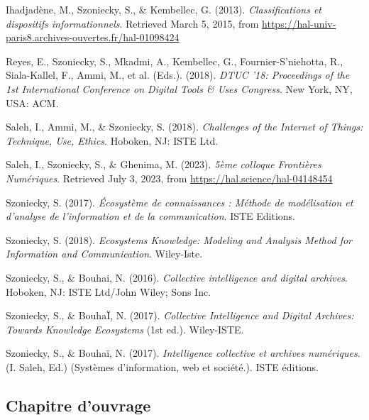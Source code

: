 \documentclass[
  a4paper,
  DIV=11,
  numbers=noendperiod]{scrreprt}
\newlength{\cslhangindent}
\newenvironment{CSLReferences}[2] %
 {\begin{list}{}{%
  \setlength{\itemindent}{0pt}
  \setlength{\leftmargin}{0pt}
  \setlength{\parsep}{0pt}
  \ifodd #1
   \setlength{\leftmargin}{\cslhangindent}
   \setlength{\itemindent}{-1\cslhangindent}
  \fi
  \setlength{\itemsep}{#2\baselineskip}}}
 {\end{list}}
\begin{document}
\label{refs-livre}
\begin{CSLReferences}{1}{0}
Ihadjadène, M., Szoniecky, S., \& Kembellec, G. (2013).
\emph{Classifications et dispositifs informationnels}. Retrieved March
5, 2015, from
\url{https://hal-univ-paris8.archives-ouvertes.fr/hal-01098424}

Reyes, E., Szoniecky, S., Mkadmi, A., Kembellec, G.,
Fournier-S'niehotta, R., Siala-Kallel, F., Ammi, M., et al. (Eds.).
(2018). \emph{{DTUC} '18: {Proceedings} of the 1st {International}
{Conference} on {Digital} {Tools} \& {Uses} {Congress}}. New York, NY,
USA: ACM.

Saleh, I., Ammi, M., \& Szoniecky, S. (2018). \emph{Challenges of the
{Internet} of {Things}: {Technique}, {Use}, {Ethics}}. Hoboken, NJ: ISTE
Ltd.

Saleh, I., Szoniecky, S., \& Ghenima, M. (2023). \emph{5ème colloque
{Frontières} {Numériques}}. Retrieved July 3, 2023, from
\url{https://hal.science/hal-04148454}

Szoniecky, S. (2017). \emph{Écosystème de connaissances : Méthode de
modélisation et d'analyse de l'information et de la communication}. ISTE
Editions.

Szoniecky, S. (2018). \emph{Ecosystems {Knowledge}: {Modeling} and
{Analysis} {Method} for {Information} and {Communication}}. Wiley-Iste.

Szoniecky, S., \& Bouhai, N. (2016). \emph{Collective intelligence and
digital archives}. Hoboken, NJ: ISTE Ltd/John Wiley; Sons Inc.

Szoniecky, S., \& BouhaÏ, N. (2017). \emph{Collective {Intelligence} and
{Digital} {Archives}: {Towards} {Knowledge} {Ecosystems}} (1st ed.).
Wiley-ISTE.

Szoniecky, S., \& Bouhaï, N. (2017). \emph{Intelligence collective et
archives numériques}. (I. Saleh, Ed.) (Systèmes d'information, web et
société.). ISTE éditions.

\end{CSLReferences}

\subsection{Chapitre d'ouvrage}\label{sec-item299377}
\end{document}
